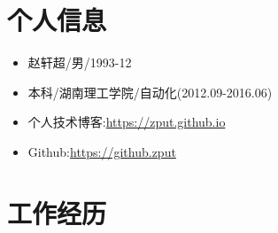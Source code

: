 \documentclass{resume}
\begin{document}


 
\section{个人信息}
\begin{itemize}[parsep=0.2ex]
  \item 赵轩超/男/1993-12
  \item 本科/湖南理工学院/自动化(2012.09-2016.06)
  \item 个人技术博客:\url{https://zput.github.io}
  \item Github:\url{https://github.zput}
\end{itemize}

\section{工作经历}
\end{document}
